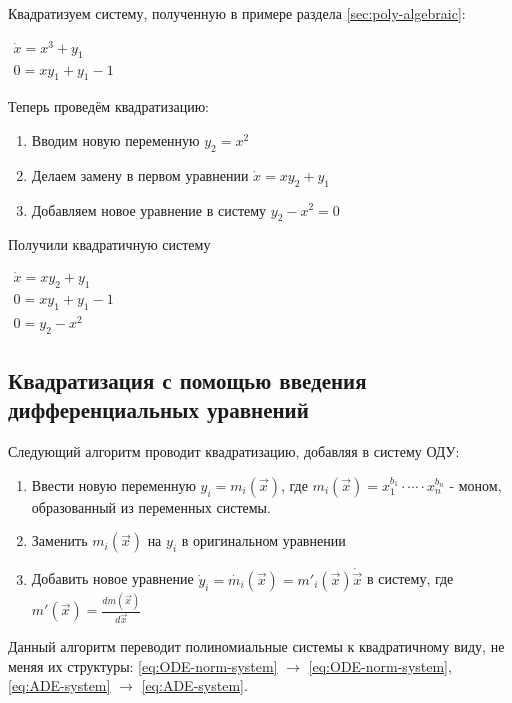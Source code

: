 \begin{example}
    Квадратизуем систему, полученную в примере раздела \ref{sec:poly-algebraic}:

    $\begin{array}{lcl}
        \dot x = x^3 + y_1 \\
        0 = xy_1 + y_1 - 1
    \end{array}$
    \newline
    
    Теперь проведём квадратизацию:
    
    \begin{enumerate}
    	\item Вводим новую переменную $y_2 =  x^2$
    	\item Делаем замену в первом уравнении $\dot x = xy_2 + y_1$
    	\item Добавляем новое уравнение в систему $y_2 - x^2 = 0$
    \end{enumerate}
    
    Получили квадратичную систему
    
    $\begin{array}{lcl}
        \dot x = xy_2 + y_1 \\
        0 = xy_1 + y_1 - 1 \\
        0 = y_2 - x^2
    \end{array}$
\end{example}


\subsection{Квадратизация с помощью введения дифференциальных уравнений} \label{sec:quad-diff}

Следующий алгоритм проводит квадратизацию, добавляя в систему ОДУ:

\begin{enumerate}
    \item Ввести новую переменную $y_i = m_i(\vec x)$, где $m_i(\vec x) = x_1^{b_1}\cdot \cdots \cdot x_n^{b_n}$ - моном, образованный из переменных системы.
    \item Заменить $m_i(\vec x)$ на $y_i$ в оригинальном уравнении
    \item Добавить новое уравнение $\dot y_i = \dot {m_i}(\vec x) = m'_i(\vec x) \dot{\vec x}$ в систему, где $m'(\vec x) = \frac {dm(\vec x)}{d \vec x}$
\end{enumerate}

Данный алгоритм переводит полиномиальные системы к квадратичному виду, не меняя их структуры: \eqref{eq:ODE-norm-system} $\longrightarrow$ \eqref{eq:ODE-norm-system}, \eqref{eq:ADE-system} $\longrightarrow$ \eqref{eq:ADE-system}.

